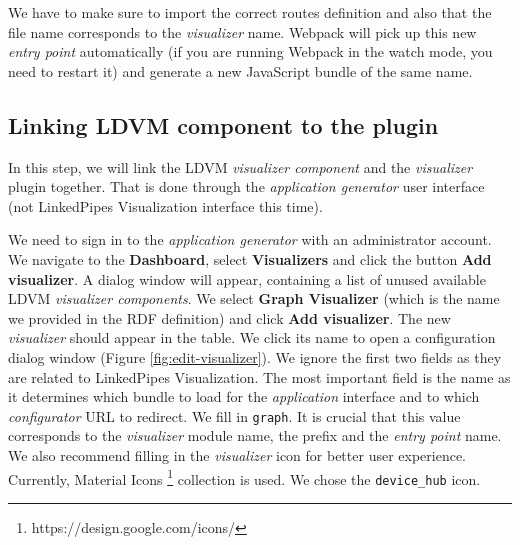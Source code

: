 We have to make sure to import the correct routes definition and also that the file name corresponds to the \emph{visualizer} name. Webpack will pick up this new \emph{entry point} automatically (if you are running Webpack in the watch mode, you need to restart it) and generate a new JavaScript bundle of the same name.

\subsection{Linking LDVM component to the plugin}
\label{sec:implementation:integrating-visualizer:5}

In this step, we will link the LDVM \emph{visualizer component} and the \emph{visualizer} plugin together. That is done through the \emph{application generator} user interface (not LinkedPipes Visualization interface this time).

We need to sign in to the \emph{application generator} with an administrator account. We navigate to the \textbf{Dashboard}, select \textbf{Visualizers} and click the button \textbf{Add visualizer}. A dialog window will appear, containing a list of unused available LDVM \emph{visualizer components}. We select \textbf{Graph Visualizer} (which is the name we provided in the RDF definition)  and click \textbf{Add visualizer}. The new \emph{visualizer} should appear in the table. We click its name to open a configuration dialog window (Figure \ref{fig:edit-visualizer}). We ignore the first two fields as they are related to LinkedPipes Visualization. The most important field is the name as it determines which bundle to load for the \emph{application} interface and to which \emph{configurator} URL to redirect. We fill in \texttt{graph}. It is crucial that this value corresponds to the \emph{visualizer} module name, the prefix and the \emph{entry point} name. We also recommend filling in the \emph{visualizer} icon for better user experience. Currently, Material Icons \footnote{https://design.google.com/icons/} collection is used. We chose the \texttt{device\_hub} icon.

